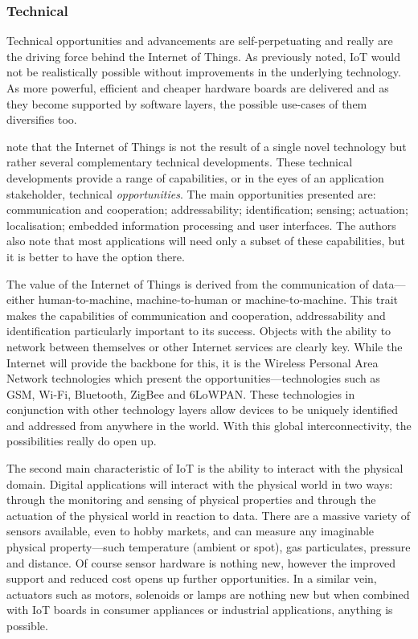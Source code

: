       \subsubsection{Technical} \label{TechnicalOpportunities}
        Technical opportunities and advancements are self-perpetuating and really are the driving force behind the Internet of Things. As previously noted, IoT would not be realistically possible without improvements in the underlying technology. As more powerful, efficient and cheaper hardware boards are delivered and as they become supported by software layers, the possible use-cases of them diversifies too.

        \citet{fromIoC} note that the Internet of Things is not the result of a single novel technology but rather several complementary technical developments. These technical developments provide a range of capabilities, or in the eyes of an application stakeholder, technical \emph{opportunities}. The main opportunities presented are: communication and cooperation; addressability; identification; sensing; actuation; localisation; embedded information processing and user interfaces. The authors also note that most applications will need only a subset of these capabilities, but it is better to have the option there.

        The value of the Internet of Things is derived from the communication of data---either human-to-machine, machine-to-human or machine-to-machine. This trait makes the capabilities of communication and cooperation, addressability and identification particularly important to its success. Objects with the ability to network between themselves or other Internet services are clearly key. While the Internet will provide the backbone for this, it is the Wireless Personal Area Network technologies which present the opportunities---technologies such as GSM, Wi-Fi, Bluetooth, ZigBee and 6LoWPAN. These technologies in conjunction with other technology layers allow devices to be uniquely identified and addressed from anywhere in the world. With this global interconnectivity, the possibilities really do open up.

        The second main characteristic of IoT is the ability to interact with the physical domain. Digital applications will interact with the physical world in two ways: through the monitoring and sensing of physical properties and through the actuation of the physical world in reaction to data. There are a massive variety of sensors available, even to hobby markets, and can measure any imaginable physical property---such temperature (ambient or spot), gas particulates, pressure and distance. Of course sensor hardware is nothing new, however the improved support and reduced cost opens up further opportunities. In a similar vein, actuators such as motors, solenoids or lamps are nothing new but when combined with IoT boards in consumer appliances or industrial applications, anything is possible.

